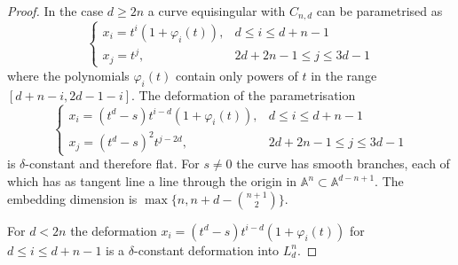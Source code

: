 \documentclass[10pt,a4paper]{amsart}
\newcommand{\A}{\mathbb{A}}
\begin{document}
\begin{proof}
In the case $d\geq 2n$  a curve equisingular with $C_{n,d}$  can be param\-etrised 
as
\[
\begin{cases}
x_i = t^i(1 + \varphi_i(t)), &  d\leq i \leq d+n-1 \\
x_j = t^j ,                & 2d+2n-1\leq j \leq 3d-1
\end{cases}
\]
where the polynomials $\varphi_i(t)$ contain only powers of $t$ in the range $[d+n-i,2d-1-i]$.
The deformation of the parametrisation
\[
\begin{cases}
x_i = (t^d-s)t^{i-d}(1 + \varphi_i(t)), &  d\leq i \leq d+n-1 \\
x_j = (t^d-s)^2t^{j-2d} ,                & 2d+2n-1\leq j \leq 3d-1
\end{cases}
\]
is $\delta$-constant and therefore flat. For $s\neq0$ the curve has smooth branches,
each of which has as tangent line a line through the origin in $\A^n\subset \A^{d-n+1}$.
The embedding dimension is  $\max\{n,n+d-\binom{n+1}2\}$.

For $d<2n$ the deformation $x_i = (t^d-s)t^{i-d}(1 + \varphi_i(t))$ for  $ d\leq i \leq d+n-1$
is a $\delta$-constant deformation into $L_d^n$.
\end{proof}
\end{document}
